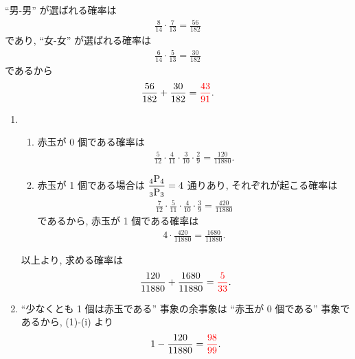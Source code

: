 ``男-男'' が選ばれる確率は
\begin{align}
	\frac{8}{14}\cdot\frac{7}{13} = \frac{56}{182}
\end{align}
であり, ``女-女'' が選ばれる確率は
\begin{align}
	\frac{6}{14}\cdot\frac{5}{13} = \frac{30}{182}
\end{align}
であるから
\begin{align}
	\frac{56}{182} + \frac{30}{182} = \textcolor{red}{\frac{43}{91}}.
\end{align}

\begin{enumerate}
	\item{
		\begin{enumerate}
			\item{
				赤玉が 0 個である確率は
				\begin{align}
					\frac{5}{12}\cdot\frac{4}{11}\cdot\frac{3}{10}\cdot\frac{2}{9} = \frac{120}{11880}.
				\end{align}
			}
			\item{
				赤玉が 1 個である場合は $\dfrac{{{}_{4}\mathrm{P}_{4}}}{{{}_{3}\mathrm{P}_{3}}} = 4$ 通りあり, それぞれが起こる確率は
				\begin{align}
					\frac{7}{12}\cdot\frac{5}{11}\cdot\frac{4}{10}\cdot\frac{3}{9} = \frac{420}{11880}
				\end{align}
				であるから, 赤玉が 1 個である確率は
				\begin{align}
					4\cdot\frac{420}{11880} = \frac{1680}{11880}.
				\end{align}
			}
		\end{enumerate}
		以上より, 求める確率は
		\begin{align}
			\frac{120}{11880} + \frac{1680}{11880} = \textcolor{red}{\frac{5}{33}}.
		\end{align}
	}
	\item{
		``少なくとも 1 個は赤玉である'' 事象の余事象は ``赤玉が 0 個である'' 事象であるから, (1)-(i) より
		\begin{align}
			1 - \frac{120}{11880} = \textcolor{red}{\frac{98}{99}}.
		\end{align}
	}
\end{enumerate}


